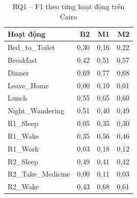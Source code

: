 \begin{table}[htbp]
\centering
\caption{RQ1 -- F1 theo từng hoạt động trên Cairo}
\label{tab:rq1-cairo}
\small
\begin{tabular}{lrrr}
\toprule
Hoạt động & B2 & M1 & M2 \\
\midrule
Bed\_to\_Toilet & 0{,}30 & 0{,}16 & 0{,}22 \\
Breakfast & 0{,}42 & 0{,}51 & 0{,}57 \\
Dinner & 0{,}69 & 0{,}77 & 0{,}68 \\
Leave\_Home & 0{,}00 & 0{,}10 & 0{,}01 \\
Lunch & 0{,}55 & 0{,}65 & 0{,}60 \\
Night\_Wandering & 0{,}51 & 0{,}40 & 0{,}49 \\
R1\_Sleep & 0{,}05 & 0{,}35 & 0{,}30 \\
R1\_Wake & 0{,}35 & 0{,}56 & 0{,}46 \\
R1\_Work & 0{,}03 & 0{,}18 & 0{,}12 \\
R2\_Sleep & 0{,}49 & 0{,}41 & 0{,}42 \\
R2\_Take\_Medicine & 0{,}00 & 0{,}11 & 0{,}03 \\
R2\_Wake & 0{,}43 & 0{,}68 & 0{,}61 \\
\bottomrule
\end{tabular}
\end{table}
